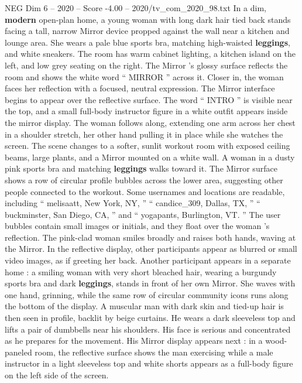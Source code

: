 \begin{textsample}{NEG Dim 6 – 2020 – Score -4.00 – 2020/tv\_com\_2020\_98.txt}  \label{ex:f6_neg_032}
In a dim, \textbf{modern} open-plan home, a young woman with long dark hair tied back stands facing a tall, narrow Mirror device propped against the wall near a kitchen and lounge area.
She wears a pale blue sports bra, matching high-waisted \textbf{leggings}, and white sneakers.
The room has warm cabinet lighting, a kitchen island on the left, and low grey seating on the right.
The Mirror ’s glossy surface reflects the room and shows the white word “ MIRROR ” across it.
Closer in, the woman faces her reflection with a focused, neutral expression.
The Mirror interface begins to appear over the reflective surface.
The word “ INTRO ” is visible near the top, and a small full-body instructor figure in a white outfit appears inside the mirror display.
The woman follows along, extending one arm across her chest in a shoulder stretch, her other hand pulling it in place while she watches the screen.
The scene changes to a softer, sunlit workout room with exposed ceiling beams, large plants, and a Mirror mounted on a white wall.
A woman in a dusty pink sports bra and matching \textbf{leggings} walks toward it.
The Mirror surface shows a row of circular profile bubbles across the lower area, suggesting other people connected to the workout.
Some usernames and locations are readable, including “ melisaatt, New York, NY, ” “ candice\_309, Dallas, TX, ” “ buckminster, San Diego, CA, ” and “ yogapants, Burlington, VT. ” The user bubbles contain small images or initials, and they float over the woman ’s reflection.
The pink-clad woman smiles broadly and raises both hands, waving at the Mirror.
In the reflective display, other participants appear as blurred or small video images, as if greeting her back.
Another participant appears in a separate home : a smiling woman with very short bleached hair, wearing a burgundy sports bra and dark \textbf{leggings}, stands in front of her own Mirror.
She waves with one hand, grinning, while the same row of circular community icons runs along the bottom of the display.
A muscular man with dark skin and tied-up hair is then seen in profile, backlit by beige curtains.
He wears a dark sleeveless top and lifts a pair of dumbbells near his shoulders.
His face is serious and concentrated as he prepares for the movement.
His Mirror display appears next : in a wood-paneled room, the reflective surface shows the man exercising while a male instructor in a light sleeveless top and white shorts appears as a full-body figure on the left side of the screen.

\end{textsample}

